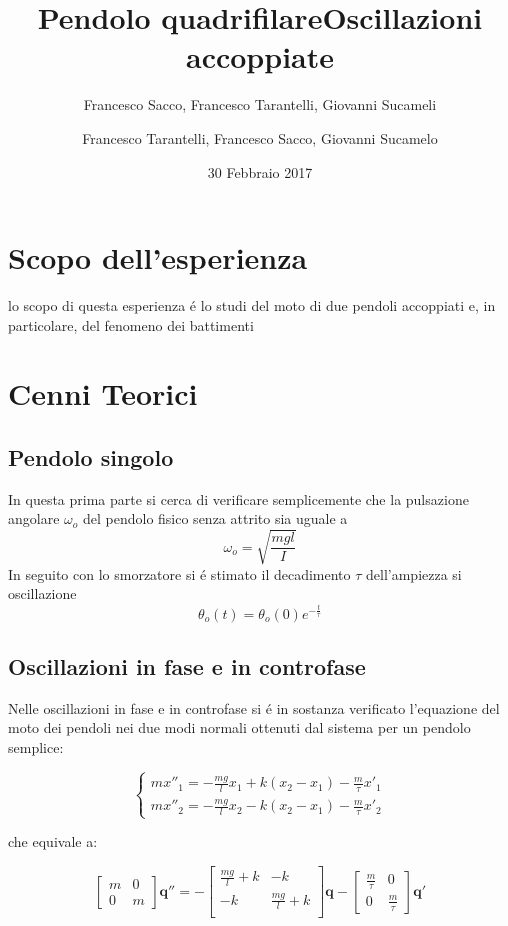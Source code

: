 \documentclass{exam}
\date{30 Febbraio 2017}
\title{Pendolo quadrifilare}
\author{Francesco Sacco, Francesco Tarantelli, Giovanni Sucameli}
\author{Francesco Tarantelli, Francesco Sacco, Giovanni Sucamelo}
\title{Oscillazioni accoppiate}
\begin{document}
	\maketitle
	\section{Scopo dell'esperienza}
		lo scopo di questa esperienza \'e lo studi del moto di due pendoli accoppiati e, in particolare, del fenomeno dei battimenti


	\section{Cenni Teorici}
		\subsection{Pendolo singolo}
			In questa prima parte si cerca di verificare semplicemente che la pulsazione angolare $\omega_o$ del pendolo fisico senza attrito sia uguale a 
			\begin{equation}
				\omega_o=\sqrt{\frac{mgl}{I}}
			\end{equation}
			In seguito con lo smorzatore si \'e stimato il decadimento $\tau $ dell'ampiezza si oscillazione
			\begin{equation}
				\theta_o(t)=\theta_o(0)e^{-\frac{t}{\tau}}
			\end{equation}
	\subsection{Oscillazioni in fase e in controfase}
		Nelle oscillazioni in fase e in controfase si \'e in sostanza verificato l'equazione del moto dei pendoli nei due modi normali ottenuti dal sistema per un pendolo semplice:

		\begin{equation}
			\begin{cases} 
				m x''_1=-\frac{mg}{l}x_1 + k(x_2-x_1) -\frac{m}{\tau} x'_1 \\
				m x''_2=-\frac{mg}{l}x_2 -  k(x_2-x_1) - \frac{m}{\tau} x'_2
			\end{cases}
		\end{equation}

		che equivale a:

		\begin{equation}
			\begin{bmatrix}
				m & 0 \\
				0 & m
			\end{bmatrix}
			\mathbf{q''}=-
			\begin{bmatrix}
				\frac{mg}{l} + k & -k \\
				-k & \frac{mg}{l} + k \\
			\end{bmatrix}
			\mathbf{q} -
			\begin{bmatrix}
				\frac{m}{\tau} & 0 \\
				0 & \frac{m}{\tau} 
			\end{bmatrix}
			\mathbf{q'} 
		\end{equation}
\end{document}
